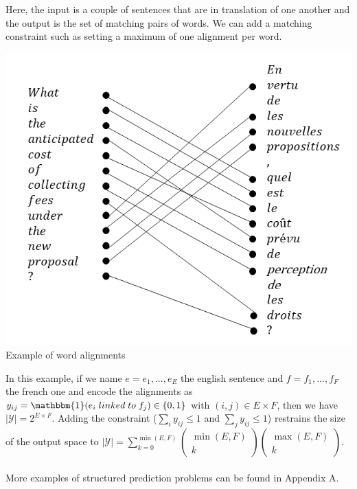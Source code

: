 \begin{example}
Here, the input is a couple of sentences that are in translation of one another
and the output is the set of matching pairs of words. We can add a matching
constraint such as setting a maximum of one alignment per word. 
\begin{center}
\includegraphics[scale=0.6]{img/lecture_1_word_alignment.png}
Example of word alignments
\end{center}

In this example, if we name $e = e_1, ..., e_E$ the english sentence and $f =
f_1, ..., f_F$ the french one and encode the alignments as $y_{ij} =
\mathbbm{1}(e_i \; linked \; to \; f_j) \in \{0,1\}$ with $(i,j) \in E \times
F$, then we have $|\mathcal{Y}| = 2^{E\times F}$. Adding the constraint
($\sum_i y_{ij} \leq 1$ and $\sum_j y_{ij} \leq 1$) restrains the size of the
output space to $|\mathcal{Y}| = \sum_{k=0}^{\min(E,F)} \begin{pmatrix}
    \min(E,F) \\ k \end{pmatrix} \begin{pmatrix} \max(E,F) \\ k \end{pmatrix}$.  \\ \\
More examples of structured prediction problems can be found in Appendix A.
\end{example}

